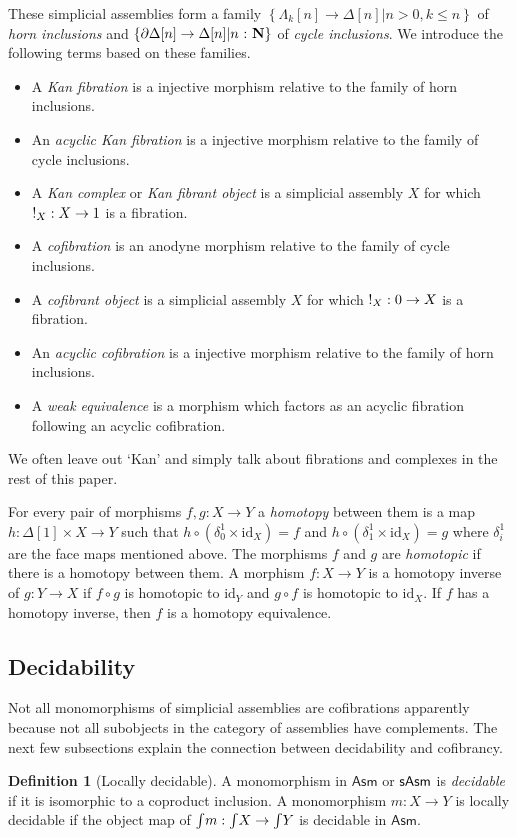 \documentclass{amsart}
\theoremstyle{plain}
\theoremstyle{definition}
\newtheorem{defin}[theorem]{Definition}
\newcommand\set[1]{\left\{#1\right\}}
\newcommand\id{\mathrm{id}}
\newcommand\Asm{\mathsf{Asm}}
\begin{document}
These simplicial assemblies form a family $\set{\Lambda_k[n]\to\Delta[n]|n>0,k\leq n}$ of \emph{horn inclusions} and $\set{\partial\Delta[n]\to\Delta[n]|n\of \nno}$ of \emph{cycle inclusions}. We introduce the following terms based on these families.
\begin{itemize}
\item A \emph{Kan fibration} is a injective morphism relative to the family of horn inclusions.
\item An \emph{acyclic Kan fibration} is a injective morphism relative to the family of cycle inclusions.
\item A \emph{Kan complex} or \emph{Kan fibrant object} is a simplicial assembly $X$ for which $!_X:X\to 1$ is a fibration.
\item A \emph{cofibration} is an anodyne morphism relative to the family of cycle inclusions.
\item A \emph{cofibrant object} is a simplicial assembly $X$ for which $!_X:0\to X$ is a fibration.
\item An \emph{acyclic cofibration} is a injective morphism relative to the family of horn inclusions.
\item A \emph{weak equivalence} is a morphism which factors as an acyclic fibration following an acyclic cofibration.
\end{itemize}
We often leave out `Kan' and simply talk about fibrations and complexes in the rest of this paper.

For every pair of morphisms $f,g:X\to Y$ a \emph{homotopy} between them is a map $h:\Delta[1]\times X\to Y$ such that $h\circ(\delta^1_0\times\id_X)=f$ and $h\circ(\delta^1_1\times\id_X)=g$ where $\delta^1_i$ are the face maps mentioned above. The morphisms $f$ and $g$ are \emph{homotopic} if there is a homotopy between them. A morphism $f:X\to Y$ is a homotopy inverse of $g:Y\to X$ if $f\circ g$ is homotopic to $\id_Y$ and $g\circ f$ is homotopic to $\id_X$. If $f$ has a homotopy inverse, then $f$ is a homotopy equivalence.

\subsection{Decidability} Not all monomorphisms of simplicial assemblies are cofibrations apparently because not all subobjects in the category of assemblies have complements. The next few subsections explain the connection between decidability and cofibrancy. 

\begin{defin}[Locally decidable] A monomorphism in $\Asm$ or $\mathsf{sAsm}$ is \emph{decidable} if it is isomorphic to a coproduct inclusion. A monomorphism $m:X\to Y$ is locally decidable if the object map of $\mathord{\int} m:\mathord{\int} X\to \mathord{\int} Y$ is decidable in $\Asm$. \end{defin}
\end{document}
